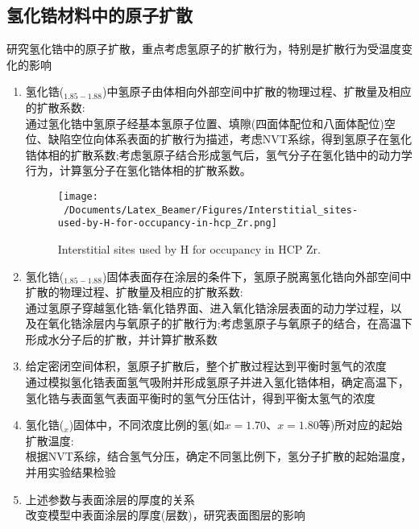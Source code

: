 \subsection{氢化锆材料中的原子扩散}
研究氢化锆中的原子扩散，重点考虑氢原子的扩散行为，特别是扩散行为受温度变化的影响
\begin{enumerate}
	\item 氢化锆($_{1.85-1.88}$)中氢原子由体相向外部空间中扩散的物理过程、扩散量及相应的扩散系数:\\
		通过氢化锆中氢原子经基本氢原子位置、填隙(四面体配位和八面体配位)空位、缺陷空位向体系表面的扩散行为描述，考虑\textrm{NVT}系综，得到氢原子在氢化锆体相的扩散系数;考虑氢原子结合形成氢气后，氢气分子在氢化锆中的动力学行为，计算氢分子在氢化锆体相的扩散系数。
\begin{figure}[!ht]
\centering
\vspace*{-0.05in}
\texttt{[image: ~/Documents/Latex\_Beamer/Figures/Interstitial\_sites-used-by-H-for-occupancy-in-hcp\_Zr.png]}
\caption{\tiny \textrm{Interstitial sites used by H for occupancy in HCP Zr.}}
\label{Fig:Interstitial_sites-used-by-H-for-occupancy-in-hcp_Zr}
\end{figure}
	\item 氢化锆($_{1.85-1.88}$)固体表面存在涂层的条件下，氢原子脱离氢化锆向外部空间中扩散的物理过程、扩散量及相应的扩散系数:\\
		通过氢原子穿越氢化锆-氧化锆界面、进入氧化锆涂层表面的动力学过程，以及在氧化锆涂层内与氧原子的扩散行为;考虑氢原子与氧原子的结合，在高温下形成水分子后的扩散，并计算扩散系数
	\item 给定密闭空间体积，氢原子扩散后，整个扩散过程达到平衡时氢气的浓度\\
		通过模拟氢化锆表面氢气吸附并形成氢原子并进入氢化锆体相，确定高温下，氢化锆与表面氢气表面平衡时的氢气分压估计，得到平衡太氢气的浓度
	\item 氢化锆($_x$)固体中，不同浓度比例的氢(如$x=1.70$、$x=1.80$等)所对应的起始扩散温度:\\
		根据\textrm{NVT}系综，结合氢气分压，确定不同氢比例下，氢分子扩散的起始温度，并用实验结果检验
	\item 上述参数与表面涂层的厚度的关系\\
		改变模型中表面涂层的厚度(层数)，研究表面图层的影响
\end{enumerate}

